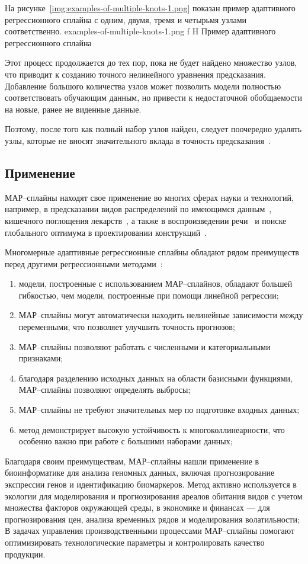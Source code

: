 На рисунке~\ref{img:examples-of-multiple-knots-1.png} показан пример адаптивного регрессионного сплайна с одним, двумя, тремя и четырьмя узлами соответственно.
{examples-of-multiple-knots-1.png}
{f}
{H}
{\textwidth}
{Пример адаптивного регрессионного сплайна}

Этот процесс продолжается до тех пор, пока не будет найдено множество узлов, что приводит к созданию точного нелинейного уравнения предсказания.
Добавление большого количества узлов может позволить модели полностью соответствовать обучающим данным, но привести к недостаточной обобщаемости на новые, ранее не виденные данные.

Поэтому, после того как полный набор узлов найден, следует поочередно удалять узлы, которые не вносят значительного вклада в точность предсказания~\cite{gitbook}.

\subsection*{Применение}

МАР--сплайны находят свое применение во многих сферах науки и технологий, например, в предсказании видов распределений по имеющимся данным~\cite{elith2007}, кишечного поглощения лекарств~\cite{deconinck2007}, а также в воспроизведении речи~\cite{haas1998} и поиске глобального оптимума в проектировании конструкций~\cite{crino2007}.

Многомерные адаптивные регрессионные сплайны обладают рядом преимуществ перед другими регрессионными методами~\cite{fedosin}:
\begin{enumerate}[label=\arabic*), leftmargin=1.6\parindent]
    \item модели, построенные с использованием МАР--сплайнов, обладают большей гибкостью, чем модели, построенные при помощи линейной регрессии;
    \item МАР--сплайны могут автоматически находить нелинейные зависимости между переменными, что позволяет улучшить точность прогнозов;
    \item МАР--сплайны позволяют работать с численными и категориальными признаками;
    \item благодаря разделению исходных данных на области базисными функциями, МАР--сплайны позволяют определять выбросы;
    \item МАР--сплайны не требуют значительных мер по подготовке входных данных;
    \item метод демонстрирует высокую устойчивость к многоколлинеарности, что особенно важно при работе с большими наборами данных;
\end{enumerate}

Благодаря своим преимуществам, МАР--сплайны нашли применение в биоинформатике для анализа геномных данных, включая прогнозирование экспрессии генов и идентификацию биомаркеров.
Метод активно используется в экологии для моделирования и прогнозирования ареалов обитания видов с учетом множества факторов окружающей среды, в экономике и финансах --- для прогнозирования цен, анализа временных рядов и моделирования волатильности;
В задачах управления производственными процессами МАР--сплайны помогают оптимизировать технологические параметры и контролировать качество продукции.
